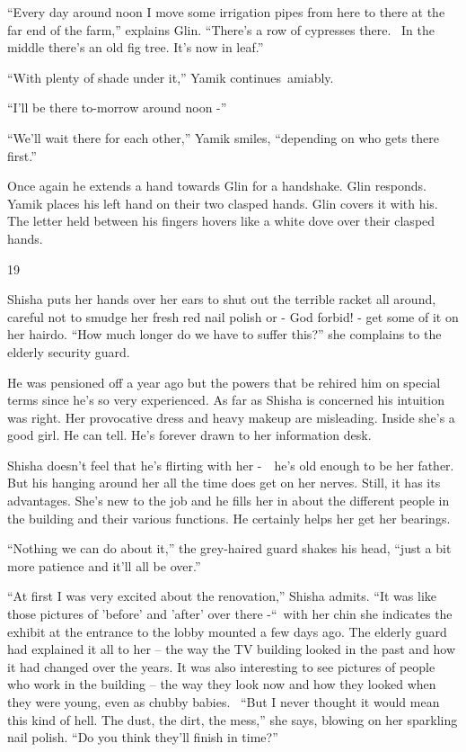 \documentclass[twoside,11pt]{book}
\begin{document}
``Every day around noon I move some irrigation pipes from here to there at the far end of the farm,''
explains Glin. ``There's a row of cypresses there. ~In the middle there's an old fig tree. It's now in
leaf.'' 

``With plenty of shade under it,'' Yamik continues~amiably. 

``I'll be there to-morrow around noon -''

``We'll wait there for each other,'' Yamik smiles, ``depending on who gets there
first.'' ~

Once again he extends a hand towards Glin for a handshake. Glin responds. Yamik places his left hand on their two
clasped hands. Glin covers it with his. The letter held between his fingers hovers like a white dove over their clasped
hands.


\bigskip

19\ 

Shisha puts her hands over her ears to shut out the terrible racket all around, careful not to smudge her fresh red nail
polish or - God forbid! - get some of it on her hairdo. ``How much longer do we have to suffer
this?'' she complains to the elderly security guard.

He was pensioned off a year ago but the powers that be rehired him on special terms since he's so very experienced. As
far as Shisha is concerned his intuition was right. Her provocative dress and heavy makeup are misleading. Inside she's
a good girl. He can tell. He{}'s forever drawn to her information desk.

Shisha doesn't feel that he's flirting with her -\ \ he's old enough to be her father. But his hanging around her all
the time does get on her nerves. Still, it has its advantages. She's new to the job and he fills her in about the
different people in the building and their various functions. He certainly helps her get her bearings.\ 

``Nothing we can do about it,'' the grey-haired guard shakes his head, ``just a
bit more patience and it'll all be over.'' ~

``At first I was very excited about the renovation,'' Shisha admits. ``It was
like those pictures of 'before' and 'after' over there -``~with her chin she indicates the exhibit at the
entrance to the lobby mounted a few days ago. The elderly guard had explained it all to her -- the way the TV building
looked in the past and how it had changed over the years. It was also interesting to see pictures of people who work in
the building -- the way they look now and how they looked when they were young, even as chubby babies.
~``But I never thought it would mean this kind of hell. The dust, the dirt, the mess,'' she
says, blowing on her sparkling nail polish. ``Do you think they'll finish in time?'' 
\end{document}

